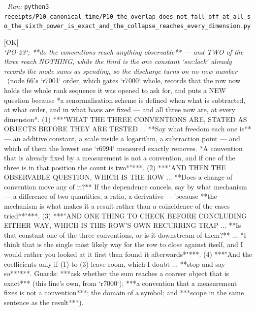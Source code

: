 \begin{description}
\ \emph{Run:} \texttt{python3 receipts/P10\_canonical\_time/P10\_the\_overlap\_does\_not\_fall\_off\_at\_all\_so\_the\_sixth\_power\_is\_exact\_and\_the\_collapse\_reaches\_every\_dimension.py}
\item[\rcptlabel{P10_two_of_the_three_conventions_reach_nothing_observable_and_the_third_is_the_constant_the_row_already_spends}{P10R47}\textbf{P10R47}\quad\texttt{P10\_two\_of\_the\_three\_conventions\_reach\_nothing\_observable\_and\_the\_third\_is\_the\_constant\_the\_row\_already\_spends}]\hfill\textsf{[OK]}\\
\textit{`PO-23`; **do the conventions reach anything observable** --- and TWO of the three reach NOTHING, while the third is the one constant `sec:lock` already records the mode sums as spending, so the discharge turns on no new number} \ (node 66's `r7001` order, which gates `r7000` whole, records that the row now holds the whole rank sequence it was opened to ask for, and puts a NEW question because *a renormalisation scheme is defined when what is subtracted, at what order, and in what basis are fixed --- and all three now are, at every dimension*. (1) ***"WHAT THE THREE CONVENTIONS ARE, STATED AS OBJECTS BEFORE THEY ARE TESTED ... **Say what freedom each one is** --- an additive constant, a scale inside a logarithm, a subtraction point --- and which of them the lowest one `r6994` measured exactly removes.  *A convention that is already fixed by a measurement is not a convention, and if one of the three is in that position the count is two*"***. (2) ***"AND THEN THE OBSERVABLE QUESTION, WHICH IS THE ROW ... **Does a change of convention move any of it?**  If the dependence cancels, say by what mechanism --- a difference of two quantities, a ratio, a derivative --- because **the mechanism is what makes it a result rather than a coincidence of the cases tried**"***. (3) ***"AND ONE THING TO CHECK BEFORE CONCLUDING EITHER WAY, WHICH IS THIS ROW'S OWN RECURRING TRAP ... **Is that constant one of the three conventions, or is it downstream of them?** ... *I think that is the single most likely way for the row to close against itself, and I would rather you looked at it first than found it afterwards*"***. (4) ***"And the coefficients only if (1) to (3) leave room, which I doubt ... **stop and say so**"***.  Guards: ***ask whether the sum reaches a coarser object that is exact*** (this line's own, from `r7000`); ***a convention that a measurement fixes is not a convention***; the domain of a symbol; and ***scope in the same sentence as the result***). 

\end{description}
